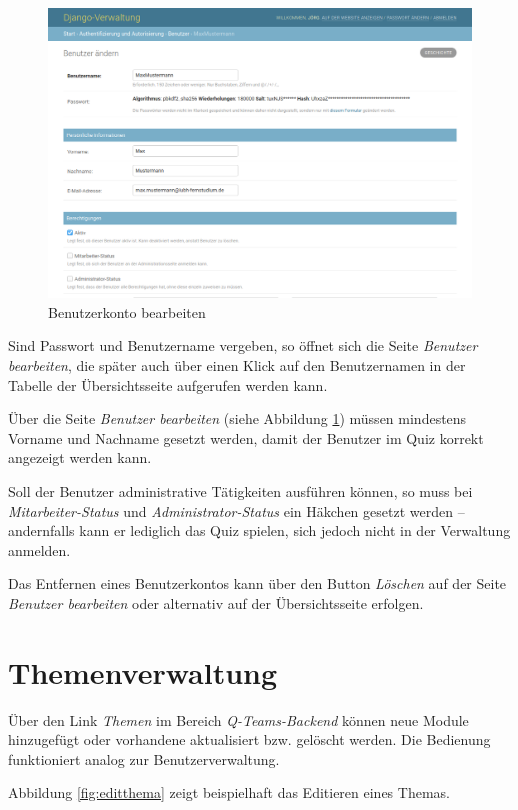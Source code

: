 \documentclass[a4paper,11pt,listof=numbered,glossary=totoc,parskip=half,toc=bib]{scrreprt}
\begin{document}
\begin{appendices}
	\begin{figure}
		\centering
		\includegraphics[width=\textwidth]{editbenutzer}
		\caption{Benutzerkonto bearbeiten}
		\label{fig:editbenutzer}
	\end{figure}
	
	Sind Passwort und Benutzername vergeben, so öffnet sich die Seite \textit{Benutzer bearbeiten}, die später auch über einen Klick auf den Benutzernamen in der Tabelle der Übersichtsseite aufgerufen werden kann.
	
	Über die Seite \textit{Benutzer bearbeiten} (siehe Abbildung \ref{fig:editbenutzer}) müssen mindestens Vorname und Nachname gesetzt werden, damit der Benutzer im Quiz korrekt angezeigt werden kann.
	
	Soll der Benutzer administrative Tätigkeiten ausführen können, so muss bei \textit{Mitarbeiter-Status} und \textit{Administrator-Status} ein Häkchen gesetzt werden -- andernfalls kann er lediglich das Quiz spielen, sich jedoch nicht in der Verwaltung anmelden.
	
	Das Entfernen eines Benutzerkontos kann über den Button \textit{Löschen} auf der Seite \textit{Benutzer bearbeiten} oder alternativ auf der Übersichtsseite erfolgen.
	
	\section{Themenverwaltung}
	Über den Link \textit{Themen} im Bereich \textit{Q-Teams-Backend} können neue Module hinzugefügt oder vorhandene aktualisiert bzw. gelöscht werden. Die Bedienung funktioniert analog zur Benutzerverwaltung.
	
	Abbildung \ref{fig:editthema} zeigt beispielhaft das Editieren eines Themas.
	

\end{appendices}
\end{document}
